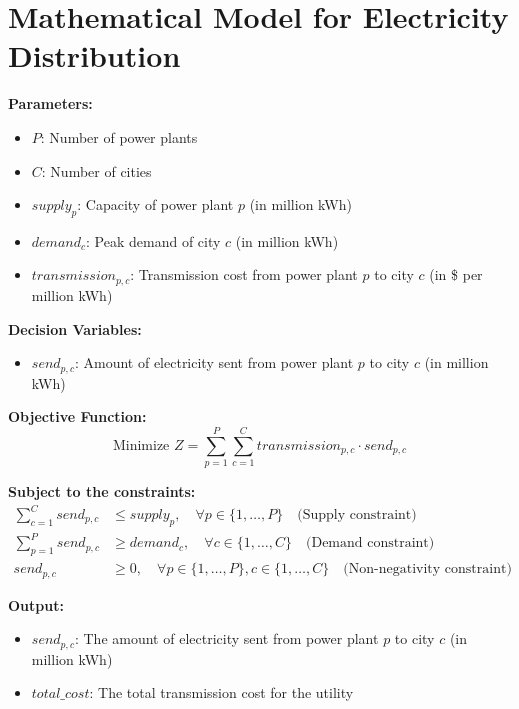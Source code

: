 \documentclass{article}
\begin{document}
\section*{Mathematical Model for Electricity Distribution}

\textbf{Parameters:}
\begin{itemize}
    \item \( P \): Number of power plants
    \item \( C \): Number of cities
    \item \( supply_p \): Capacity of power plant \( p \) (in million kWh)
    \item \( demand_c \): Peak demand of city \( c \) (in million kWh)
    \item \( transmission_{p,c} \): Transmission cost from power plant \( p \) to city \( c \) (in \$ per million kWh)
\end{itemize}

\textbf{Decision Variables:}
\begin{itemize}
    \item \( send_{p,c} \): Amount of electricity sent from power plant \( p \) to city \( c \) (in million kWh)
\end{itemize}

\textbf{Objective Function:}
\[
\text{Minimize } Z = \sum_{p=1}^{P} \sum_{c=1}^{C} transmission_{p,c} \cdot send_{p,c}
\]

\textbf{Subject to the constraints:}
\begin{align*}
    \sum_{c=1}^{C} send_{p,c} & \leq supply_p, \quad \forall p \in \{1, \ldots, P\} \quad \text{(Supply constraint)} \\
    \sum_{p=1}^{P} send_{p,c} & \geq demand_c, \quad \forall c \in \{1, \ldots, C\} \quad \text{(Demand constraint)} \\
    send_{p,c} & \geq 0, \quad \forall p \in \{1, \ldots, P\}, c \in \{1, \ldots, C\} \quad \text{(Non-negativity constraint)}
\end{align*}

\textbf{Output:}
\begin{itemize}
    \item \( send_{p,c} \): The amount of electricity sent from power plant \( p \) to city \( c \) (in million kWh)
    \item \( total\_cost \): The total transmission cost for the utility
\end{itemize}
\end{document}
